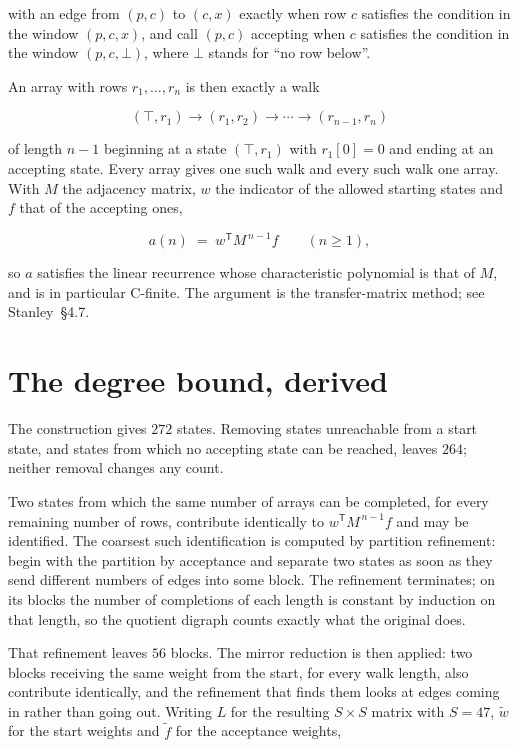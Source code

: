 \documentclass[11pt]{article}
\theoremstyle{definition}
\begin{document}
with an edge from $(p,c)$ to $(c,x)$ exactly when row $c$ satisfies the condition in the window $(p,c,x)$, and call $(p,c)$ accepting when $c$ satisfies the condition in the window $(p,c,\bot)$, where $\bot$ stands for ``no row below''.

An array with rows $r_1,\dots,r_n$ is then exactly a walk

\[(\top,r_1) \to (r_1,r_2) \to \cdots \to (r_{n-1},r_n)\]

of length $n-1$ beginning at a state $(\top,r_1)$ with $r_1[0]=0$ and ending at an accepting state. Every array gives one such walk and every such walk one array. With $M$ the adjacency matrix, $w$ the indicator of the allowed starting states and $f$ that of the accepting ones,

\[a(n) \;=\; w^{\mathsf T} M^{\,n-1} f \qquad (n \ge 1),\]

so $a$ satisfies the linear recurrence whose characteristic polynomial is that of $M$, and is in particular C-finite. The argument is the transfer-matrix method; see Stanley~\S4.7.

\section{The degree bound, derived}

The construction gives $272$ states. Removing states unreachable from a start state, and states from which no accepting state can be reached, leaves $264$; neither removal changes any count.

Two states from which the same number of arrays can be completed, for every remaining number of rows, contribute identically to $w^{\mathsf T}M^{\,n-1}f$ and may be identified. The coarsest such identification is computed by partition refinement: begin with the partition by acceptance and separate two states as soon as they send different numbers of edges into some block. The refinement terminates; on its blocks the number of completions of each length is constant by induction on that length, so the quotient digraph counts exactly what the original does.

That refinement leaves $56$ blocks. The mirror reduction is then applied: two blocks receiving the same weight from the start, for every walk length, also contribute identically, and the refinement that finds them looks at edges coming in rather than going out. Writing $L$ for the resulting $S \times S$ matrix with $S = 47$, $\tilde w$ for the start weights and $\tilde f$ for the acceptance weights,
\end{document}
